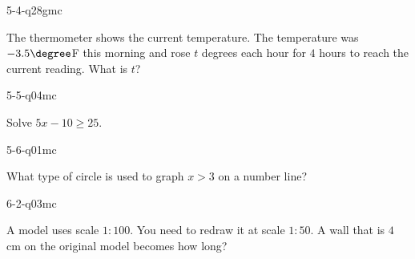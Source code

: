 \begin{practiceQuestion}{5-4-q28}{gmc}
\begin{questionText}
The thermometer shows the current temperature. The temperature was $-3.5\degree$F this morning and rose $t$ degrees each hour for $4$ hours to reach the current reading. What is $t$?

\begin{center}
\end{center}
\end{questionText}
\end{practiceQuestion}

\begin{practiceQuestion}{5-5-q04}{mc}
\begin{questionText}
Solve $5x - 10 \geq 25$.
\end{questionText}
\end{practiceQuestion}

\begin{practiceQuestion}{5-6-q01}{mc}
\begin{questionText}
What type of circle is used to graph $x > 3$ on a number line?
\end{questionText}
\end{practiceQuestion}

\begin{practiceQuestion}{6-2-q03}{mc}
\begin{questionText}
A model uses scale $1:100$. You need to redraw it at scale $1:50$. A wall that is $4$ cm on the original model becomes how long?
\end{questionText}
\end{practiceQuestion}

